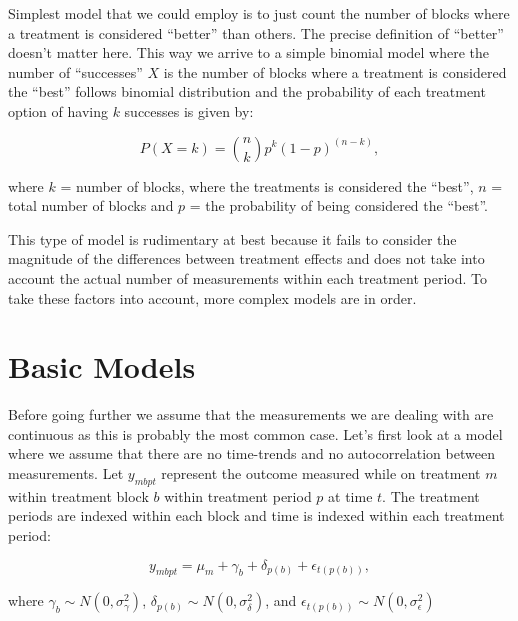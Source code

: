\documentclass[12pt,a4paper,leqno]{report}
\theoremstyle{plain}
\theoremstyle{definition}
\theoremstyle{remark}
\begin{document}
Simplest model that we could employ is to just count the number of blocks where
a treatment is considered ``better'' than others. The precise definition of
``better'' doesn't matter here. This way we arrive to a simple binomial model
where the number of ``successes'' \(X\) is the number of blocks where a
treatment is considered the ``best'' follows binomial distribution and the
probability of each treatment option of having \(k\) successes is given by:

\begin{def}\label{}
    \begin{equation}
        P(X = k) = {n\choose k}p^k{(1-p)}^{(n-k)},
    \end{equation}
\end{def}where \(k\) = number of blocks, where the treatments is considered the
``best'', \(n\) = total number of blocks and \(p\) = the probability of being
considered the ``best''.

This type of model is rudimentary at best because it fails to consider the
magnitude of the differences between treatment effects and does not take into
account the actual number of measurements within each treatment period. To take
these factors into account, more complex models are in order.

\section{Basic Models}\label{conti}

Before going further we assume that the measurements we are dealing with are continuous
as this is probably the most common case. Let's first look at a model where
we assume that there are no time-trends and no autocorrelation between
measurements. Let \(y_{mbpt}\) represent the outcome measured while on treatment
\(m\) within treatment block \(b\) within treatment period \(p\) at time \(t\).
The treatment periods are indexed within each block and time is indexed within
each treatment period:

\begin{def}\label{}
    \begin{equation}\label{allerrors}
        y_{mbpt} = \mu_m + \gamma_b + \delta_{p(b)} + \epsilon_{t(p(b))},
    \end{equation}
\end{def}where \(\gamma_b \sim N(0,\sigma^2_{\gamma})\), \(\delta_{p(b)} \sim
N(0,\sigma^2_{\delta})\), and \(\epsilon_{t(p(b))} \sim
N(0,\sigma^2_{\epsilon})\)
\end{document}
